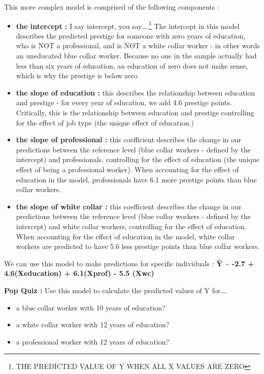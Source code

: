 \documentclass[
  letterpaper,
  DIV=11,
  numbers=noendperiod,
  oneside]{scrreprt}
\begin{document}
This more complex model is comprised of the following components :~

\begin{itemize}
\item
  \textbf{the intercept :} I say intercept, you say\ldots.\footnote{THE
    PREDICTED VALUE OF Y WHEN ALL X VALUES ARE ZERO} The intercept in
  this model describes the predicted prestige for someone with zero
  years of education, who is NOT a professional, and is NOT a white
  collar worker - in other words an uneducated blue collar worker.
  Because no one in the sample actually had less than six years of
  education, an education of zero does not make sense, which is why the
  prestige is below zero.
\item
  \textbf{the slope of education :} this describes the relationship
  between education and prestige - for every year of education, we add
  4.6 prestige points. Critically, this is the relationship between
  education and prestige controlling for the effect of job type (the
  unique effect of education.)
\item
  \textbf{the slope of professional :} this coefficient describes the
  change in our predictions between the reference level (blue collar
  workers - defined by the intercept) and professionals, controlling for
  the effect of education (the unique effect of being a professional
  worker). When accounting for the effect of education in the model,
  professionals have 6.1 more prestige points than blue collar workers.
\item
  \textbf{the slope of white collar :} this coefficient describes the
  change in our predictions between the reference level (blue collar
  workers - defined by the intercept) and white collar workers,
  controlling for the effect of education. When accounting for the
  effect of education in the model, white collar workers are predicted
  to have 5.6 less prestige points than blue collar workers.
\end{itemize}

We can use this model to make predictions for specific individuals :
\textbf{Ŷ \textasciitilde{} -2.7 + 4.6(Xeducation) + 6.1(Xprof) - 5.5
(Xwc)}

\textbf{Pop Quiz :} Use this model to calculate the predicted values of
Y for\ldots.

\begin{itemize}
\item
  a blue collar worker with 10 years of education?
\item
  a white collar worker with 12 years of education?
\item
  a professional worker with 12 years of education?
\end{itemize}
\end{document}
